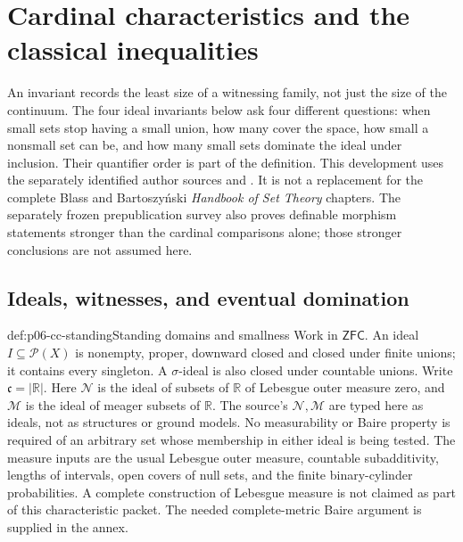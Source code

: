 \section{Cardinal characteristics and the classical inequalities}
\label{sec:p06-cardinal-characteristics}

An invariant records the least size of a witnessing family, not just the
size of the continuum. The four ideal invariants below ask four different
questions: when small sets stop having a small union, how many cover the
space, how small a nonsmall set can be, and how many small sets dominate
the ideal under inclusion. Their quantifier order is part of the definition.
This development uses the separately identified author sources
\cite[\S522, version of 11 July 2023]{Fremlin522Author2023} and
\cite[\S2, arXiv version 1]{BlassReductions1994V1}.
It is not a replacement for the complete Blass and Bartoszy\'nski
\emph{Handbook of Set Theory} chapters.
The separately frozen prepublication survey
\cite[\S\S2--3, arXiv version 1]{BartoszynskiInvariants1999V1}
also proves definable morphism statements stronger than the cardinal
comparisons alone; those stronger conclusions are not assumed here.

\subsection{Ideals, witnesses, and eventual domination}

\begin{hbconvention}{def:p06-cc-standing}{Standing domains and smallness}
Work in \(\mathsf{ZFC}\). An ideal \(I\subseteq\mathcal P(X)\) is nonempty, proper,
downward closed and closed under finite unions; it contains every singleton.
A \(\sigma\)-ideal is also closed under countable unions. Write
\(\mathfrak c=|\mathbb R|\). Here \(\mathcal N\) is the
ideal of subsets of \(\mathbb R\) of Lebesgue outer measure zero, and
\(\mathcal M\) is the ideal of meager subsets of
\(\mathbb R\). The source's \(\mathcal N,\mathcal M\) are typed here as
ideals, not as structures or ground models. No measurability or Baire
property is required of an arbitrary set whose membership in either ideal
is being tested.
The measure inputs are the usual Lebesgue outer measure, countable
subadditivity, lengths of intervals, open covers of null sets, and the
finite binary-cylinder probabilities. A complete construction of Lebesgue
measure is not claimed as part of this characteristic packet. The needed
complete-metric Baire argument is supplied in the annex.
\end{hbconvention}

